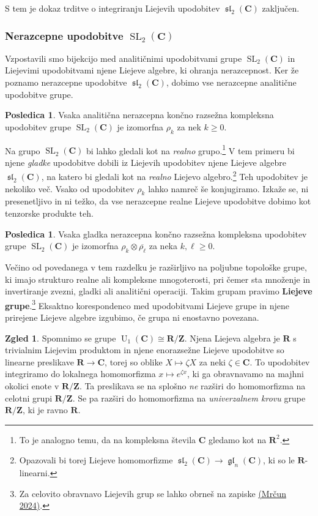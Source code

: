 \documentclass[11pt]{book}
\def\ZZ{\mathbf{Z}}
\def\RR{\mathbf{R}}
\def\CC{\mathbf{C}}
\DeclareMathOperator\glfrak{\mathfrak{gl}}
\DeclareMathOperator\slfrak{\mathfrak{sl}}
\DeclareMathOperator\U{U}
\DeclareMathOperator\SL{SL}
\def\definicija{\color{rdeca}\bf}
\theoremstyle{definition}
\theoremstyle{zgled}
\newtheorem{zgled}[theorem]{Zgled}
\theoremstyle{zgledbrezstevilke}
\theoremstyle{odprtproblem}
\theoremstyle{domacanaloga}
\theoremstyle{izrek}
\newtheorem{posledica}[theorem]{Posledica}
\begin{document}
S tem je dokaz trditve o integriranju Liejevih upodobitev $\slfrak_2(\CC)$ zaključen. 

\subsubsection{Nerazcepne upodobitve $\SL_2(\CC)$}

Vzpostavili smo bijekcijo med analitičnimi upodobitvami grupe $\SL_2(\CC)$ in Liejevimi upodobitvami njene Liejeve algebre, ki ohranja nerazcepnost. Ker že poznamo nerazcepne upodobitve $\slfrak_2(\CC)$, dobimo vse nerazcepne analitične upodobitve grupe.

\begin{posledica}
Vsaka analitična nerazcepna končno razsežna kompleksna upodobitev grupe $\SL_2(\CC)$ je izomorfna $\rho_k$ za nek $k \geq 0$.
\end{posledica}

Na grupo $\SL_2(\CC)$ bi lahko gledali kot na \emph{realno} grupo.\footnote{To je analogno temu, da na kompleksna števila $\CC$ gledamo kot na $\RR^2$.} V tem primeru bi njene \emph{gladke} upodobitve dobili iz Liejevih upodobitev njene Liejeve algebre $\slfrak_2(\CC)$, na katero bi gledali kot na \emph{realno} Liejevo algebro.\footnote{Opazovali bi torej Liejeve homomorfizme $\slfrak_2(\CC) \to \glfrak_n(\CC)$, ki so le $\RR$-linearni.} Teh upodobitev je nekoliko več. Vsako od upodobitev $\rho_k$ lahko namreč še konjugiramo. Izkaže se, ni presenetljivo in ni težko, da vse nerazcepne realne Liejeve upodobitve dobimo kot tenzorske produkte teh.

\begin{posledica}
Vsaka gladka nerazcepna končno razsežna kompleksna upodobitev grupe $\SL_2(\CC)$ je izomorfna $\rho_k \otimes \overline{\rho_{\ell}}$ za neka $k, \ell \geq 0$.
\end{posledica}

Večino od povedanega v tem razdelku je razširljivo na poljubne topološke grupe, ki imajo strukturo realne ali kompleksne mnogoterosti, pri čemer sta množenje in invertiranje zvezni, gladki ali analitični operaciji. Takim grupam pravimo {\definicija Liejeve grupe}.\footnote{Za celovito obravnavo Liejevih grup se lahko obrneš na zapiske \href{https://users.fmf.uni-lj.si/mrcun/preprints/lg.pdf}{(Mrčun 2024)}.} Eksaktno korespondenco med upodobitvami Liejeve grupe in njene prirejene Liejeve algebre izgubimo, če grupa ni enostavno povezana. 

\begin{zgled}
Spomnimo se grupe $\U_1(\CC) \cong \RR/\ZZ$. Njena Liejeva algebra je $\RR$ s trivialnim Liejevim produktom in njene enorazsežne Liejeve upodobitve so linearne preslikave $\RR \to \CC$, torej so oblike $X \mapsto \zeta X$ za neki $\zeta \in \CC$. To upodobitev integriramo do lokalnega homomorfizma $x \mapsto e^{\zeta x}$, ki ga obravnavamo na majhni okolici enote v $\RR/\ZZ$. Ta preslikava se na splošno \emph{ne} razširi do homomorfizma na celotni grupi $\RR/\ZZ$. Se pa razširi do homomorfizma na \emph{univerzalnem krovu} grupe $\RR/\ZZ$, ki je ravno $\RR$.
\end{zgled}
\end{document}
